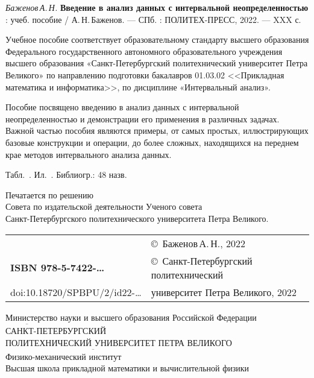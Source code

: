 \documentclass[a5paper,openany]{book}
\newcommand{\ov}{\overline}
\begin{document}
{\it Баженов\,А.\,Н.}
{\bf Введение в анализ данных с интервальной неопределенностью} : учеб. пособие /  А.\,Н.\,Баженов.
--- СПб. : ПОЛИТЕХ-ПРЕСС, 2022. --- XXX с.
\hfill \break

{\small 
Учебное пособие соответствует образовательному стандарту высшего
образования Федерального государственного автономного образовательного учреждения высшего образования «Санкт-Петербургский политехнический университет Петра Великого» по направлению подготовки бакалавров 01.03.02 <<Прикладная математика и информатика>>, по дисциплине «Интервальный анализ».


Пособие посвящено введению в анализ данных с интервальной неопределенностью
и демонстрации его применения в различных задачах.  
Важной частью пособия являются примеры, от самых простых, иллюстрирующих базовые конструкции и операции, до более сложных, находящихся на переднем крае методов интервального анализа данных. 


\hfill \break
Табл.~. Ил.~. Библиогр.: 48 назв.
\hfill \break
\hfill \break

 \begin{center}
{\small  	
Печатается по решению\\
Совета по издательской деятельности Ученого совета\\
Санкт-Петербургского политехнического  университета Петра Великого. }
 \end{center}

\hfill \break
\begin{tabular}{ll}
	~ & \copyright  \ Баженов\,А.\,Н., 2022 \\
{\bf ISBN 978-5-7422-\ldots} & \copyright \
Санкт-Петербургский политехнический \\
doi:10.18720/SPBPU/2/id22-\ldots & университет Петра Великого, 2022
\end{tabular}


\thispagestyle{empty}

\begin{center}
	\hfill \break
	Министерство науки и высшего образования  Российской Федерации\\
	$\ov{~~~~~~~~~~~~~~~~~~~~~~~}$\\
	\normalsize{	САНКТ-ПЕТЕРБУРГСКИЙ \\
		ПОЛИТЕХНИЧЕСКИЙ УНИВЕРСИТЕТ ПЕТРА ВЕЛИКОГО}\\ 
	$\ov{~~~~~~~~~~~~~~~~~~~~~~~~~~~~~~~~~~~~~~~~~~~~~~~~~~~~~~~~~~~~~~~~~~~~~~~~~~~~~~~~~~~~~~~~~~~~~~}$\\	
	Физико-механический институт\\
	Высшая школа прикладной математики и вычислительной физики\\
	\hfill \break
	

\end{center}}
\end{document}
